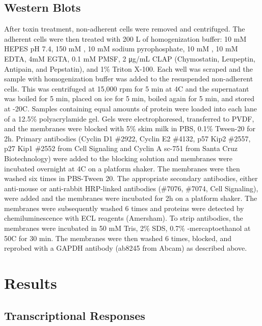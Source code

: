 \subsection{Western Blots}
After toxin treatment, non-adherent cells were removed 
and centrifuged. The adherent cells were then treated 
with 200 \textmugreek{}L of homogenization buffer: 10 mM HEPES 
pH 7.4, 150 mM , 10 mM sodium pyrophosphate, 10 
mM , 10 mM EDTA, 4mM EGTA, 0.1 mM PMSF, 2 μg/mL 
CLAP (Chymostatin, Leupeptin, Antipain, and Pepstatin), 
and 1\% Triton X-100. Each well was scraped and the 
sample with homogenization buffer was added to the resuspended 
non-adherent cells. This was centrifuged at 15,000 rpm 
for 5 min at 4\textdegree{}C and the supernatant was 
boiled for 5 min, placed on ice for 5 min, boiled 
again for 5 min, and stored at -20\textdegree{}C. Samples 
containing equal amounts of protein were loaded 
into each lane of a 12.5\% polyacrylamide gel. Gels were 
electrophoresed, transferred to PVDF, and the membranes were 
blocked with 5\% skim milk in PBS, 0.1\% Tween-20 for 2h. 
Primary antibodies (Cyclin D1 \#2922, Cyclin E2 \#4132, p57 
Kip2 \#2557, p27 Kip1 \#2552 from Cell Signaling and Cyclin A 
sc-751 from Santa Cruz Biotechnology) were added to the 
blocking solution and membranes were incubated overnight 
at 4\textdegree{}C on a platform shaker. The membranes were 
then washed six times in PBS-Tween 20. The appropriate 
secondary antibodies, either anti-mouse or anti-rabbit 
HRP-linked antibodies (\#7076, \#7074, Cell Signaling), 
were added and the membranes were incubated for 2h on a 
platform shaker. The membranes were subsequently washed 
6 times and proteins were detected by chemiluminescence 
with ECL reagents (Amersham). To strip antibodies, the 
membranes were incubated in 50 mM Tris, 2\% SDS, 0.7\% 
\textbeta{}-mercaptoethanol at 50\textdegree{}C for 30 min. 
The membranes were then washed 6 times, blocked, and reprobed 
with a GAPDH antibody (ab8245 from Abcam) as described above.


\section{Results}

\subsection{Transcriptional Responses}

